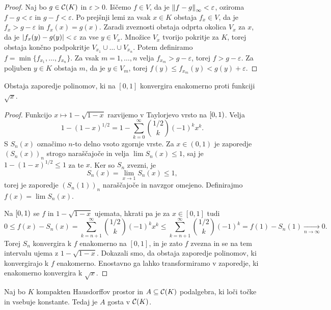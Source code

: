\begin{proof}
  Naj bo $g \in \mathcal{C}(K)$ in $\varepsilon > 0$.
  Iščemo $f \in V$, da je $\left\lVert f-g\right\rVert_\infty < \varepsilon$, oziroma $f-g <
  \varepsilon$ in $g-f < \varepsilon$.
  Po prejšnji lemi za vsak $x \in K$ obstaja $f_x \in V$, da je $f_x > g -
  \varepsilon$ in $f_x(x) = g(x)$.
  Zaradi zveznosti obstaja odprta okolica $V_x$ za $x$, da je $\left| f_x(y) -
	g(y) \right| < \varepsilon$ za vse $y \in V_x$.
  Množice $V_x$ tvorijo pokritje za $K$, torej obstaja končno podpokritje
  $V_{x_1} \cup \ldots \cup V_{x_n}$.
  Potem definiramo $f = \min \{ f_{x_1}, \ldots, f_{x_n} \}$.
  Za vsak $m = 1, \ldots, n$ velja $f_{x_m} > g - \varepsilon$, torej $f > g -
  \varepsilon$.
  Za poljuben $y \in K$ obstaja $m$, da je $y \in V_m$, torej $f(y) \le
  f_{x_m}(y) < g(y) + \varepsilon$.
\end{proof}

\begin{lema}
  Obstaja zaporedje polinomov, ki na $[0,1]$ konvergira enakomerno proti
  funkciji $\sqrt{x}$.
\end{lema}

\begin{proof}
  Funkcijo $x \mapsto 1 - \sqrt{1-x}$ razvijemo v Taylorjevo vrsto na $\left[0,1\right)$.
  Velja
  \[
	1 - (1 - x)^{1/2} = 1 - \sum_{k=0}^\infty \binom{1/2}{k} (-1)^k x^k.
  \]
  S $S_n(x)$ označimo $n$-to delno vsoto zgornje vrste.
  Za $x \in (0,1)$ je zaporedje $(S_n(x))_n$ strogo naraščajoče in velja $\lim
  S_n(x) \le 1$, saj je $1 - (1 - x)^{1/2} \le 1$ za te $x$.
  Ker so $S_n$ zvezni, je
  \[
	S_n(x) = \lim_{x \to 1} S_n(x) \le 1,
  \]
  torej je zaporedje $(S_n(1))_n$ naraščajoče in navzgor omejeno.
  Definirajmo $f(x) = \lim S_n(x)$.

  Na $\left[0,1\right)$ se $f$ in $1 - \sqrt{1-x}$ ujemata, hkrati pa je za $x \in
  [0,1]$ tudi
  \[
	0 \le f(x) - S_n(x) = \sum_{k=n+1}^\infty \binom{1/2}{k} (-1)^k x^k
	\le \sum_{k=n+1}^\infty \binom{1/2}{k} (-1)^k
	= f(1) - S_n(1) \xrightarrow[n \to \infty]{} 0.
  \]
  Torej $S_n$ konvergira k $f$ enakomerno na $[0,1]$, in je zato $f$ zvezna in
  se na tem intervalu ujema z $1 - \sqrt{1-x}$.
  Dokazali smo, da obstaja zaporedje polinomov, ki konvergirajo k $f$
  enakomerno.
  Enostavno ga lahko transformiramo v zaporedje, ki enakomerno konvergira k
  $\sqrt{x}$.
\end{proof}

\begin{izrek}
  Naj bo $K$ kompakten Hausdorffov prostor in $A \subseteq \mathcal{C}(K)$
  podalgebra, ki loči točke in vsebuje konstante.
  Tedaj je $A$ gosta v $\mathcal{C}(K)$.
\end{izrek}

